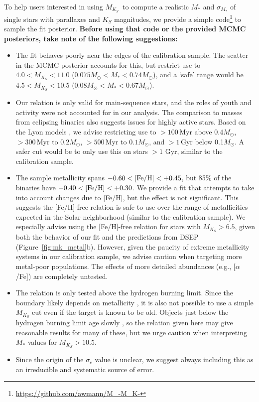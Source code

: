 \documentclass[twocolumn]{aastex62}
\newcommand{\mks}{$M_{K_S}$}
\begin{document}
To help users interested in using \mks\ to compute a realistic $M_*$ and $\sigma_{M_*}$ of single stars with parallaxes and $K_S$ magnitudes, we provide a simple code\footnote{\href{https://github.com/awmann/M_-M_K-}{https://github.com/awmann/M\_-M\_K-}} to sample the fit posterior. {\bf Before using that code or the provided MCMC posteriors, take note of the following suggestions:}
\begin{itemize}
\item The fit behaves poorly near the edges of the calibration sample. The scatter in the MCMC posterior accounts for this, but restrict use to $4.0<M_{K_S}<11.0$ ($0.075M_\odot<M_*<0.74M_\odot$), and a `safe' range would be $4.5<M_{K_S}<10.5$ ($0.08M_\odot<M_*<0.67M_\odot$). 

\item Our relation is only valid for main-sequence stars, and the roles of youth and activity were not accounted for in our analysis. The comparison to masses from eclipsing binaries also suggests issues for highly active stars. Based on the Lyon models \citep{BHAC15}, we advise restricting use to $>100$\,Myr above $0.4M_\odot$, $>300$\,Myr to $0.2M_\odot$, $>500$\,Myr to $0.1M_\odot$, and $>1$\,Gyr below 0.1$M_\odot$. A safer cut would be to only use this on stars $>1$ Gyr, similar to the calibration sample.

\item The sample metallicity spans $-0.60<\rm{[Fe/H]}<+0.45$, but 85\% of the binaries have $-0.40<\rm{[Fe/H]}<+0.30$. We provide a fit that attempts to take into account changes due to [Fe/H], but the effect is not significant. This suggests the [Fe/H]-free relation is safe to use over the range of metallicities expected in the Solar neighborhood (similar to the calibration sample). We especially advise using the [Fe/H]-free relation for stars with \mks$>6.5$, given both the behavior of our fit and the predictions from DSEP (Figure~\ref{fig:mk_metal}b). However, given the paucity of extreme metallicity systems in our calibration sample, we advise caution when targeting more metal-poor populations. The effects of more detailed abundances (e.g., [$\alpha$/Fe]) are completely untested.

\item The relation is only tested above the hydrogen burning limit. Since the boundary likely depends on metallicity \citep{2001RvMP...73..719B}, it is also not possible to use a simple $M_{K_S}$ cut even if the target is known to be old. Objects just below the hydrogen burning limit age slowly \citep{BHAC15}, so the relation given here may give reasonable results for many of these, but we urge caution when interpreting $M_*$ values for $M_{K_S}>10.5$. 

\item Since the origin of the $\sigma_e$ value is unclear, we suggest always including this as an irreducible and systematic source of error.

\end{itemize}
\end{document}
